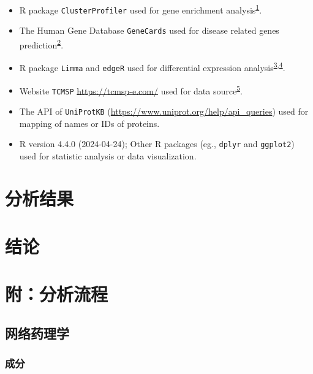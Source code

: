 \documentclass[
]{article}
\providecommand{\tightlist}{%
  \setlength{\itemsep}{0pt}\setlength{\parskip}{0pt}}
\begin{document}
\begin{itemize}
\tightlist
\item
  R package \texttt{ClusterProfiler} used for gene enrichment analysis\textsuperscript{\protect\hyperlink{ref-ClusterprofilerWuTi2021}{1}}.
\item
  The Human Gene Database \texttt{GeneCards} used for disease related genes prediction\textsuperscript{\protect\hyperlink{ref-TheGenecardsSStelze2016}{2}}.
\item
  R package \texttt{Limma} and \texttt{edgeR} used for differential expression analysis\textsuperscript{\protect\hyperlink{ref-LimmaPowersDiRitchi2015}{3},\protect\hyperlink{ref-EdgerDifferenChen}{4}}.
\item
  Website \texttt{TCMSP} \url{https://tcmsp-e.com/} used for data source\textsuperscript{\protect\hyperlink{ref-TcmspADatabaRuJi2014}{5}}.
\item
  The API of \texttt{UniProtKB} (\url{https://www.uniprot.org/help/api_queries}) used for mapping of names or IDs of proteins.
\item
  R version 4.4.0 (2024-04-24); Other R packages (eg., \texttt{dplyr} and \texttt{ggplot2}) used for statistic analysis or data visualization.
\end{itemize}

\hypertarget{results}{%
\section{分析结果}\label{results}}

\hypertarget{dis}{%
\section{结论}\label{dis}}

\hypertarget{workflow}{%
\section{附：分析流程}\label{workflow}}

\hypertarget{ux7f51ux7edcux836fux7406ux5b66}{%
\subsection{网络药理学}\label{ux7f51ux7edcux836fux7406ux5b66}}

\hypertarget{ux6210ux5206}{%
\subsubsection{成分}\label{ux6210ux5206}}
\end{document}
